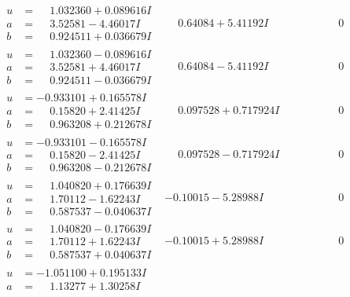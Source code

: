 \documentclass[1p]{elsarticle_modified}
\theoremstyle{definition}
\begin{document}
$$\begin{array}{c|c|c}
\begin{aligned}
u &= \phantom{-}1.032360 + 0.089616 I \\
a &= \phantom{-}3.52581 - 4.46017 I \\
b &= \phantom{-}0.924511 + 0.036679 I\end{aligned}
 & \phantom{-}0.64084 + 5.41192 I & \phantom{-0.000000 } 0 \\ \hline\begin{aligned}
u &= \phantom{-}1.032360 - 0.089616 I \\
a &= \phantom{-}3.52581 + 4.46017 I \\
b &= \phantom{-}0.924511 - 0.036679 I\end{aligned}
 & \phantom{-}0.64084 - 5.41192 I & \phantom{-0.000000 } 0 \\ \hline\begin{aligned}
u &= -0.933101 + 0.165578 I \\
a &= \phantom{-}0.15820 + 2.41425 I \\
b &= \phantom{-}0.963208 + 0.212678 I\end{aligned}
 & \phantom{-}0.097528 + 0.717924 I & \phantom{-0.000000 } 0 \\ \hline\begin{aligned}
u &= -0.933101 - 0.165578 I \\
a &= \phantom{-}0.15820 - 2.41425 I \\
b &= \phantom{-}0.963208 - 0.212678 I\end{aligned}
 & \phantom{-}0.097528 - 0.717924 I & \phantom{-0.000000 } 0 \\ \hline\begin{aligned}
u &= \phantom{-}1.040820 + 0.176639 I \\
a &= \phantom{-}1.70112 - 1.62243 I \\
b &= \phantom{-}0.587537 - 0.040637 I\end{aligned}
 & -0.10015 - 5.28988 I & \phantom{-0.000000 } 0 \\ \hline\begin{aligned}
u &= \phantom{-}1.040820 - 0.176639 I \\
a &= \phantom{-}1.70112 + 1.62243 I \\
b &= \phantom{-}0.587537 + 0.040637 I\end{aligned}
 & -0.10015 + 5.28988 I & \phantom{-0.000000 } 0 \\ \hline\begin{aligned}
u &= -1.051100 + 0.195133 I \\
a &= \phantom{-}1.13277 + 1.30258 I \\

\end{aligned}
\end{array}$$
\end{document}
